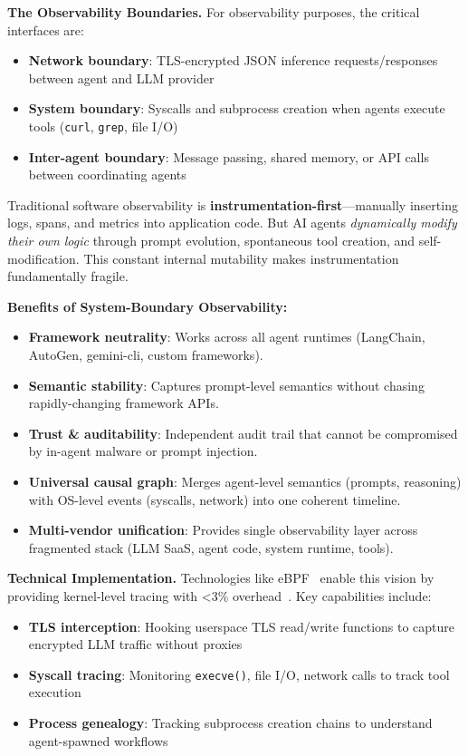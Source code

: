 \documentclass[sigplan,screen,review,9pt]{acmart}
\begin{document}
\textbf{The Observability Boundaries.} For observability purposes, the critical interfaces are:
\begin{itemize}
  \item \textbf{Network boundary}: TLS-encrypted JSON inference requests/responses between agent and LLM provider
  \item \textbf{System boundary}: Syscalls and subprocess creation when agents execute tools (\texttt{curl}, \texttt{grep}, file I/O)
  \item \textbf{Inter-agent boundary}: Message passing, shared memory, or API calls between coordinating agents
\end{itemize}

Traditional software observability is \textbf{instrumentation-first}—manually inserting logs, spans, and metrics into application code. But AI agents \emph{dynamically modify their own logic} through prompt evolution, spontaneous tool creation, and self-modification. This constant internal mutability makes instrumentation fundamentally fragile.

\textbf{Benefits of System-Boundary Observability:}
\begin{itemize}
  \item \textbf{Framework neutrality}: Works across all agent runtimes (LangChain, AutoGen, gemini-cli, custom frameworks).
  \item \textbf{Semantic stability}: Captures prompt-level semantics without chasing rapidly-changing framework APIs.
  \item \textbf{Trust \& auditability}: Independent audit trail that cannot be compromised by in-agent malware or prompt injection.
  \item \textbf{Universal causal graph}: Merges agent-level semantics (prompts, reasoning) with OS-level events (syscalls, network) into one coherent timeline.
  \item \textbf{Multi-vendor unification}: Provides single observability layer across fragmented stack (LLM SaaS, agent code, system runtime, tools).
\end{itemize}

\textbf{Technical Implementation.} Technologies like eBPF~\cite{brendangregg,ebpfio} enable this vision by providing kernel-level tracing with <3\% overhead~\cite{zheng2025extending}. Key capabilities include:
\begin{itemize}
  \item \textbf{TLS interception}: Hooking userspace TLS read/write functions to capture encrypted LLM traffic without proxies
  \item \textbf{Syscall tracing}: Monitoring \texttt{execve()}, file I/O, network calls to track tool execution
  \item \textbf{Process genealogy}: Tracking subprocess creation chains to understand agent-spawned workflows
\end{itemize}
\end{document}
